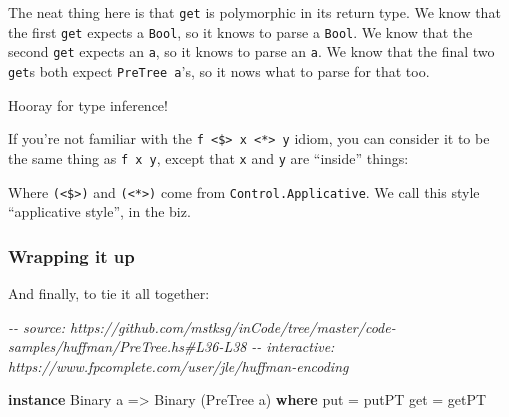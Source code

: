 \documentclass[]{article}
\newenvironment{Shaded}{}{}
\newcommand{\CommentTok}[1]{\textcolor[rgb]{0.38,0.63,0.69}{\textit{#1}}}
\newcommand{\DataTypeTok}[1]{\textcolor[rgb]{0.56,0.13,0.00}{#1}}
\newcommand{\DecValTok}[1]{\textcolor[rgb]{0.25,0.63,0.44}{#1}}
\newcommand{\KeywordTok}[1]{\textcolor[rgb]{0.00,0.44,0.13}{\textbf{#1}}}
\newcommand{\NormalTok}[1]{#1}
\newcommand{\OperatorTok}[1]{\textcolor[rgb]{0.40,0.40,0.40}{#1}}
\newcommand{\OtherTok}[1]{\textcolor[rgb]{0.00,0.44,0.13}{#1}}
\begin{document}
The neat thing here is that \texttt{get} is polymorphic in its return type. We
know that the first \texttt{get} expects a \texttt{Bool}, so it knows to parse a
\texttt{Bool}. We know that the second \texttt{get} expects an \texttt{a}, so it
knows to parse an \texttt{a}. We know that the final two \texttt{get}s both
expect \texttt{PreTree\ a}'s, so it nows what to parse for that too.

Hooray for type inference!

If you're not familiar with the
\texttt{f\ \textless{}\$\textgreater{}\ x\ \textless{}*\textgreater{}\ y} idiom,
you can consider it to be the same thing as \texttt{f\ x\ y}, except that
\texttt{x} and \texttt{y} are ``inside'' things:

\begin{Shaded}
\end{Shaded}

Where \texttt{(\textless{}\$\textgreater{})} and
\texttt{(\textless{}*\textgreater{})} come from \texttt{Control.Applicative}. We
call this style ``applicative style'', in the biz.

\subsubsection{Wrapping it up}\label{wrapping-it-up}

And finally, to tie it all together:

\begin{Shaded}
\begin{Highlighting}[]
\CommentTok{{-}{-} source: https://github.com/mstksg/inCode/tree/master/code{-}samples/huffman/PreTree.hs\#L36{-}L38}
\CommentTok{{-}{-} interactive: https://www.fpcomplete.com/user/jle/huffman{-}encoding}

\KeywordTok{instance} \DataTypeTok{Binary}\NormalTok{ a }\OtherTok{=\textgreater{}} \DataTypeTok{Binary}\NormalTok{ (}\DataTypeTok{PreTree}\NormalTok{ a) }\KeywordTok{where}
\NormalTok{    put }\OtherTok{=}\NormalTok{ putPT}
\NormalTok{    get }\OtherTok{=}\NormalTok{ getPT}
\end{Highlighting}
\end{Shaded}
\end{document}
